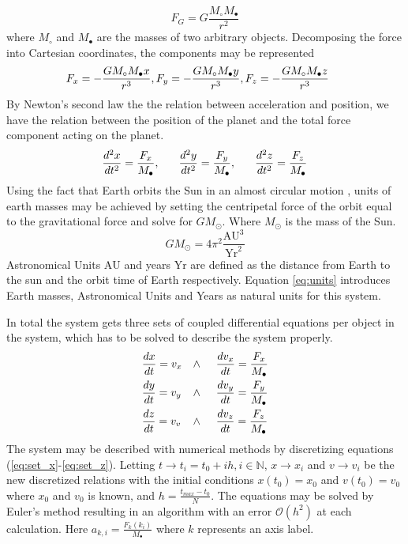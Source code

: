 \documentclass[twoside,twocolumn]{article}
\newcommand{\nl}{
	
	\medskip
	\noindent
}
\newcommand{\sun}{\odot}
\newcommand{\planet}{\bullet}
\newcommand{\AU}{\text{AU}}
\newcommand{\Yr}{\text{Yr}}
\newcommand{\err}[1]{\mathcal{O}(#1)}
\begin{document}
\begin{equation}
F_{G}=G\frac{M_\circ M_\planet}{r^2}
\end{equation} 
where $M_\circ$ and $M_\planet$ are the masses of two arbitrary objects. Decomposing the force into Cartesian coordinates, the components may be represented
\begin{equation*}
\hspace{-0.5cm}F_x=-\frac{GM_\circ M_\planet x}{r^3},F_y=-\frac{GM_\circ M_\planet y}{r^3},F_z=-\frac{GM_\circ M_\planet z}{r^3}
\end{equation*}
By Newton's second law the the relation between acceleration and position, we have the relation between the position of the planet and the total force component acting on the planet.
\begin{equation*}
\frac{d^2x}{dt^2}=\frac{F_x}{M_\planet},\hspace{0.6cm}\frac{d^2y}{dt^2}=\frac{F_y}{M_\planet},\hspace{0.6cm}\frac{d^2z}{dt^2}=\frac{F_z}{M_\planet}
\end{equation*}
Using the fact that Earth orbits the Sun in an almost circular motion \citep{NASA:orbit}, units of earth masses may be achieved by setting the centripetal force of the orbit equal to the gravitational force and solve for $GM_\sun$. Where $M_\sun$ is the mass of the Sun.
\begin{equation}
GM_\sun = 4\pi^2 \frac{\AU^3}{\Yr^2} \label{eq:units}
\end{equation}
Astronomical Units $\AU$ and years $\Yr$ are defined as the distance from Earth to the sun and the orbit time of Earth respectively. Equation \ref{eq:units} introduces Earth masses, Astronomical Units and Years as natural units for this system.\nl
In total the system gets three sets of coupled differential equations per object in the system, which has to be solved to describe the system properly.
\begin{align}
&\frac{dx}{dt}=v_x &\wedge \hspace{0.5cm} &\frac{dv_x}{dt}=\frac{F_x}{M_\planet}\label{eq:set_x}\\
&\frac{dy}{dt}=v_y &\wedge \hspace{0.5cm} &\frac{dv_y}{dt}=\frac{F_y}{M_\planet}\label{eq:set_y}\\
&\frac{dz}{dt}=v_v &\wedge \hspace{0.5cm} &\frac{dv_z}{dt}=\frac{F_z}{M_\planet}\label{eq:set_z}
\end{align}
The system may be described with numerical methods by discretizing equations (\ref{eq:set_x}-\ref{eq:set_z}). Letting  $t\rightarrow t_i=t_0+ih, i\in \mathbb{N}$, $x\rightarrow x_i$ and $v\rightarrow v_i$ be the new discretized relations with the initial conditions $x(t_0)=x_0$ and $v(t_0)=v_0$ where $x_0$ and $v_0$ is known, and $h=\frac{t_{max}-t_0}{N} $. The equations may be solved by Euler's method resulting in an algorithm with an error $\err{h^2}$ at each calculation. Here $a_{k,i}=\frac{F_k(k_i)}{M_\planet}$ where $k$ represents an axis label.
\end{document}
